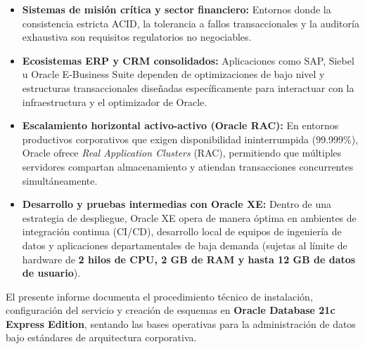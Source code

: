     \begin{itemize}
    	\item \textbf{Sistemas de misión crítica y sector financiero:} Entornos donde la consistencia estricta ACID, la tolerancia a fallos transaccionales y la auditoría exhaustiva son requisitos regulatorios no negociables.
    	\item \textbf{Ecosistemas ERP y CRM consolidados:} Aplicaciones como SAP, Siebel u Oracle E-Business Suite dependen de optimizaciones de bajo nivel y estructuras transaccionales diseñadas específicamente para interactuar con la infraestructura y el optimizador de Oracle.
    	\item \textbf{Escalamiento horizontal activo-activo (Oracle RAC):} En entornos productivos corporativos que exigen disponibilidad ininterrumpida (99.999\%), Oracle ofrece \textit{Real Application Clusters} (RAC), permitiendo que múltiples servidores compartan almacenamiento y atiendan transacciones concurrentes simultáneamente.
    	\item \textbf{Desarrollo y pruebas intermedias con Oracle XE:} Dentro de una estrategia de despliegue, Oracle XE opera de manera óptima en ambientes de integración continua (CI/CD), desarrollo local de equipos de ingeniería de datos y aplicaciones departamentales de baja demanda (sujetas al límite de hardware de \textbf{2 hilos de CPU, 2 GB de RAM y hasta 12 GB de datos de usuario}).
    \end{itemize}
    
    El presente informe documenta el procedimiento técnico de instalación, configuración del servicio y creación de esquemas en \textbf{Oracle Database 21c Express Edition}, sentando las bases operativas para la administración de datos bajo estándares de arquitectura corporativa.